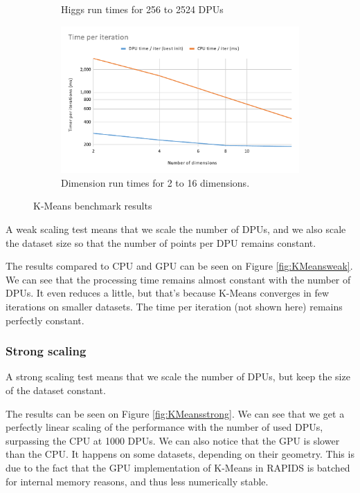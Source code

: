 \begin{figure}
\begin{subfigure}{0.48\linewidth}
        \caption{Higgs run times for 256 to 2524 DPUs}
        \label{fig:KMeansHiggs}
    \end{subfigure}\hfill
    \begin{subfigure}{0.48\linewidth}
        \includegraphics[width=\linewidth]{figures/KMeansdim.pdf}
        \caption{Dimension run times for 2 to 16 dimensions.}
        \label{fig:KMeansdim}
    \end{subfigure}
    \caption{K-Means benchmark results}
\end{figure}

A weak scaling test means that we scale the number of DPUs, and we also scale the dataset size so that the number of points per DPU remains constant.

The results compared to CPU and GPU can be seen on Figure \ref{fig:KMeansweak}. We can see that the processing time remains almost constant with the number of DPUs. It even reduces a little, but that's because K-Means converges in few iterations on smaller datasets. The time per iteration (not shown here) remains perfectly constant.

\subsubsection{Strong scaling}

A strong scaling test means that we scale the number of DPUs, but keep the size of the dataset constant.

The results can be seen on Figure \ref{fig:KMeansstrong}. We can see that we get a perfectly linear scaling of the performance with the number of used DPUs, surpassing the CPU at 1000 DPUs. We can also notice that the GPU is slower than the CPU. It happens on some datasets, depending on their geometry. This is due to the fact that the GPU implementation of K-Means in RAPIDS is batched for internal memory reasons, and thus less numerically stable.

